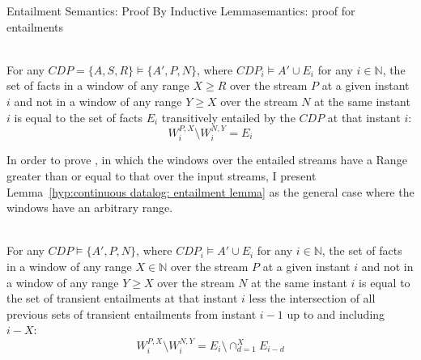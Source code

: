 \begin{nestedsection}{Entailment Semantics: Proof By Inductive Lemma}{semantics: proof for entailments}
	\begin{hyp} \hfill \\
		For any ${CDP = \{A,S,R\} \vDash \{A',P,N\}}$, where ${CDP_{i} \vDash A' \cup E_{i}}$ for any ${i \in \mathbb{N}}$, the set of facts in a window of any range ${X \geq R}$ over the stream $P$ at a given instant ${i}$ and not in a window of any range ${Y \geq X}$ over the stream $N$ at the same instant $i$ is equal to the set of facts $E_{i}$ transitively entailed by the ${CDP}$ at that instant $i$:
		\begin{equation*}
			W^{P,X}_{i} \setminus W^{N,Y}_{i} = E_{i}
		\end{equation*}
	\end{hyp}
	In order to prove , in which the windows over the entailed streams have a Range greater than or equal to that over the input streams, I present Lemma~\ref{hyp:continuous datalog: entailment lemma} as the general case where the windows have an arbitrary range.
	\begin{lem}\label{hyp:continuous datalog: entailment lemma} \hfill \\
		For any ${CDP \vDash \{A',P,N\}}$, where ${CDP_{i} \vDash A' \cup E_{i}}$ for any ${i \in \mathbb{N}}$, the set of facts in a window of any range ${X \in \mathbb{N}}$ over the stream $P$ at a given instant ${i}$ and not in a window of any range ${Y \geq X}$ over the stream $N$ at the same instant $i$ is equal to the set of transient entailments at that instant $i$ less the intersection of all previous sets of transient entailments from instant ${i-1}$ up to and including ${i-X}$:
		\begin{equation*}
			W^{P,X}_{i} \setminus W^{N,Y}_{i} = E_{i} \setminus \mathop{\cap}^{X}_{d=1} E_{i-d}
		\end{equation*}
	\end{lem}


\end{nestedsection}
